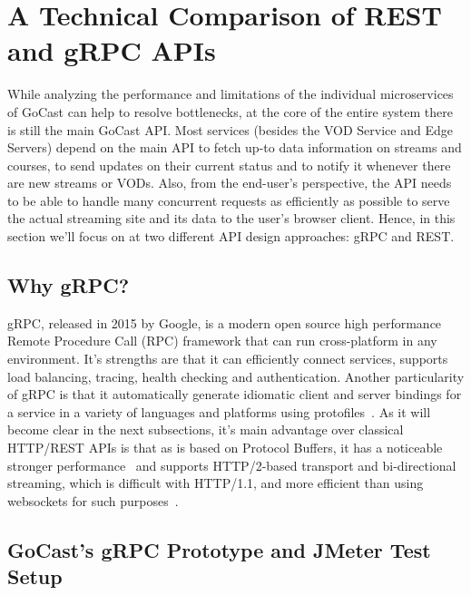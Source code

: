 
\section{A Technical Comparison of REST and gRPC APIs}

While analyzing the performance and limitations of the individual microservices of GoCast can help to resolve bottlenecks, at the core of the entire system there is still the main GoCast \ac{API}.
Most services (besides the VOD Service and Edge Servers) depend on the main \ac{API} to fetch up-to data information on streams and courses, to send updates on their current status and to notify it whenever there are new streams or \ac{VOD}s. Also, from the end-user's perspective, the API needs to be able to handle many concurrent requests as efficiently as possible to serve the actual streaming site and its data to the user's browser client.
Hence, in this section we'll focus on at two different \ac{API} design approaches: gRPC and REST.

\subsection{Why gRPC?}

gRPC, released in 2015 by Google, is a modern open source high performance Remote Procedure Call (RPC) framework that can run cross-platform in any environment. It's strengths are that it can efficiently connect services, supports load balancing, tracing, health checking and authentication.
Another particularity of gRPC is that it automatically generate idiomatic client and server bindings for a service in a variety of languages and platforms using protofiles~\parencite{grpc_vs_rest}.
As it will become clear in the next subsections, it's main advantage over classical HTTP/REST \ac{API}s is that as is based on Protocol Buffers, it has a noticeable stronger performance~\parencite{grpc_vs_rest_2} and supports HTTP/2-based transport and bi-directional streaming, which is difficult with HTTP/1.1, and more efficient than using websockets for such purposes~\parencite{grpc_dev}.

\subsection{GoCast's gRPC Prototype and JMeter Test Setup}

